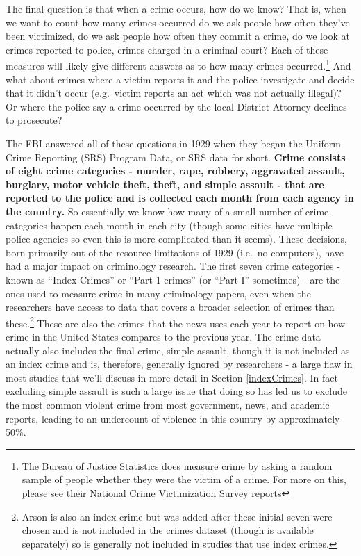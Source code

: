 \documentclass[
  12pt,
  openany]{book}
\begin{document}
The final question is that when a crime occurs, how do we know? That is, when we want to count how many crimes occurred do we ask people how often they've been victimized, do we ask people how often they commit a crime, do we look at crimes reported to police, crimes charged in a criminal court? Each of these measures will likely give different answers as to how many crimes occurred.\footnote{The Bureau of Justice Statistics does measure crime by asking a random sample of people whether they were the victim of a crime. For more on this, please see their National Crime Victimization Survey reports} And what about crimes where a victim reports it and the police investigate and decide that it didn't occur (e.g.~victim reports an act which was not actually illegal)? Or where the police say a crime occurred by the local District Attorney declines to prosecute?

The FBI answered all of these questions in 1929 when they began the Uniform Crime Reporting (SRS) Program Data, or SRS data for short. \textbf{Crime consists of eight crime categories - murder, rape, robbery, aggravated assault, burglary, motor vehicle theft, theft, and simple assault - that are reported to the police and is collected each month from each agency in the country.} So essentially we know how many of a small number of crime categories happen each month in each city (though some cities have multiple police agencies so even this is more complicated than it seems). These decisions, born primarily out of the resource limitations of 1929 (i.e.~no computers), have had a major impact on criminology research. The first seven crime categories - known as ``Index Crimes'' or ``Part 1 crimes'' (or ``Part I'' sometimes) - are the ones used to measure crime in many criminology papers, even when the researchers have access to data that covers a broader selection of crimes than these.\footnote{Arson is also an index crime but was added after these initial seven were chosen and is not included in the crimes dataset (though is available separately) so is generally not included in studies that use index crimes.} These are also the crimes that the news uses each year to report on how crime in the United States compares to the previous year. The crime data actually also includes the final crime, simple assault, though it is not included as an index crime and is, therefore, generally ignored by researchers - a large flaw in most studies that we'll discuss in more detail in Section \ref{indexCrimes}. In fact excluding simple assault is such a large issue that doing so has led us to exclude the most common violent crime from most government, news, and academic reports, leading to an undercount of violence in this country by approximately 50\%.
\end{document}
